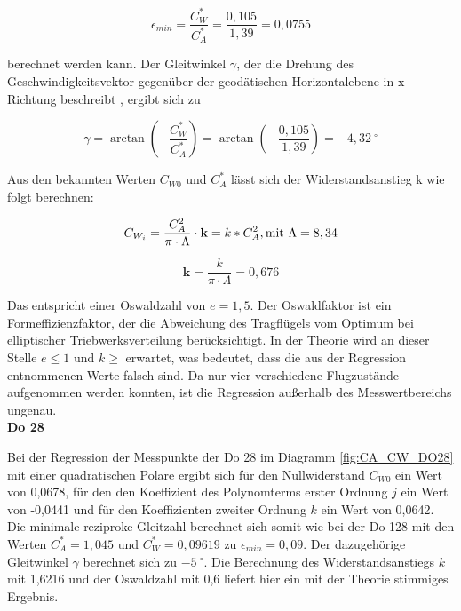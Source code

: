 \begin{equation}
\epsilon_{min}=\frac{C_{W}^{\ast}}{C_{A}^{\ast}}=\frac{0,105}{1,39}=0,0755
\end{equation}

berechnet werden kann. Der Gleitwinkel $\gamma$, der die Drehung des Geschwindigkeitsvektor gegenüber der geodätischen Horizontalebene in x-Richtung beschreibt \cite{Skript}, ergibt sich zu

\begin{equation}
\gamma=\arctan \left(-\frac{C^{*}_W}{C^{*}_A} \right)= \arctan \left(-\frac{0,105}{1,39} \right)= -4,32 \ ^{\circ}  
\end{equation}

Aus den bekannten Werten $C_{W0}$ und $C^{*}_A$ lässt sich der Widerstandsanstieg k wie folgt berechnen: 

\begin{equation}
C_{W_{i}}=\frac{C_A^2}{\pi \cdot \Lambda}\cdot \textbf{k}=k*C_A^2, \\ \mathrm{mit} \ \Lambda=8,34 
\end{equation}

\begin{equation}
\textbf{k}= \frac{k}{\pi \cdot \Lambda}=0,676
\end{equation}


Das entspricht einer Oswaldzahl von $e=1,5$. Der Oswaldfaktor ist ein Formeffizienzfaktor, der die Abweichung des Tragflügels vom Optimum bei elliptischer Triebwerksverteilung berücksichtigt. In der Theorie wird an dieser Stelle $e\leq 1$ und $k\geq $ erwartet, was bedeutet, dass die aus der Regression entnommenen Werte falsch sind. Da nur vier verschiedene Flugzustände aufgenommen werden konnten, ist die Regression außerhalb des Messwertbereichs ungenau. \\

\textbf{Do 28}

Bei der Regression der Messpunkte der Do 28 im Diagramm \ref{fig:CA_CW_DO28} mit einer quadratischen Polare ergibt sich für den Nullwiderstand $C_{W0}$ ein Wert von 0,0678, für den den Koeffizient des Polynomterms erster Ordnung $j$ ein Wert von -0,0441 und für den Koeffizienten zweiter Ordnung $k$ ein Wert von 0,0642. Die minimale reziproke Gleitzahl berechnet sich somit wie bei der Do 128 mit den Werten 
$C^{*}_A=1,045$ und $C^{*}_W=0,09619$ zu $\epsilon_{min}=0,09$. 
Der dazugehörige Gleitwinkel $\gamma$ berechnet sich zu $-5 \ ^{\circ}$. Die Berechnung des Widerstandsanstiegs $k$ mit 1,6216 und der Oswaldzahl mit 0,6 liefert hier ein mit der Theorie stimmiges Ergebnis. 

